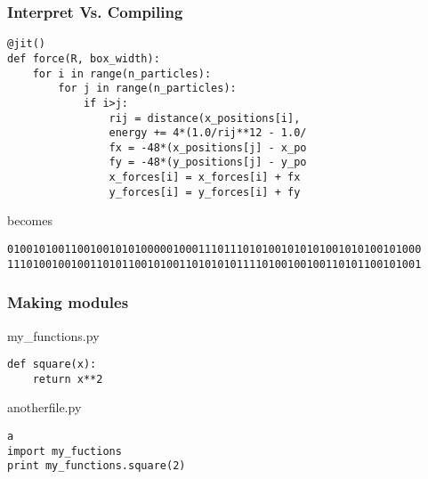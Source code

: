 \begin{frame}[fragile]

    \frametitle{Interpret Vs. Compiling}

\begin{lstlisting}
@jit()
def force(R, box_width):
    for i in range(n_particles):
        for j in range(n_particles):
            if i>j:
                rij = distance(x_positions[i],
                energy += 4*(1.0/rij**12 - 1.0/
                fx = -48*(x_positions[j] - x_po
                fy = -48*(y_positions[j] - y_po
                x_forces[i] = x_forces[i] + fx
                y_forces[i] = y_forces[i] + fy
\end{lstlisting}

    becomes

\begin{lstlisting}
01001010011001001010100000100011101110101001010101001010100101000
11101001001001101011001010011010101011110100100100110101100101001
\end{lstlisting}


\end{frame}


\begin{frame}[fragile]

    \frametitle{Making modules}

my\_functions.py
\begin{lstlisting}
def square(x):
    return x**2

\end{lstlisting}

\bigskip

anotherfile.py
\begin{lstlisting}a
import my_fuctions
print my_functions.square(2)
\end{lstlisting}

\end{frame}


